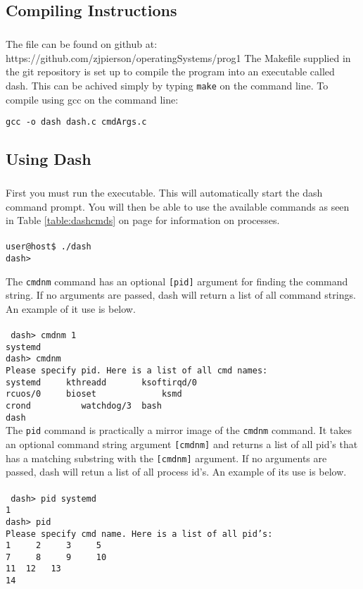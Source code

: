 \documentclass[10pt]{article}
\begin{document}
\subsection{Compiling Instructions}
\subparagraph{}
The file can be found on github at:  https://github.com/zjpierson/operatingSystems/prog1
The Makefile supplied in the git repository is set up to compile the program into an executable called dash. This can be achived simply by typing \texttt{make} on the command line. To compile using gcc on the command line:
\begin{center}
	\texttt{gcc -o dash dash.c cmdArgs.c}
\end{center}

\subsection{Using Dash}
\subparagraph{}
First you must run the executable. This will automatically start the dash command prompt. You will then be able to use the available commands as seen in Table \ref{table:dashcmds} on page \pageref{table:dashcmds} for information on processes.\\\\
\texttt{user@host\$ ./dash\\
		dash>}

\newpage

The \texttt{cmdnm} command has an optional \texttt{[pid]} argument for finding the command string. If no arguments are passed, dash will return a list of all command strings.  An example of it use is below.\\\\
\texttt
{
dash> cmdnm 1\\
systemd\\
dash> cmdnm\\
Please specify pid. Here is a list of all cmd names:\\
systemd\,\,\,\, kthreadd\,\,\,\,\,\, ksoftirqd/0\\
rcuos/0\,\,\,\, bioset\,\,\,\,\,\,\,\,\,\,\,\, ksmd\\
crond\,\,\,\,\,\,\,\,\, watchdog/3\, bash\\
dash
}\\

The \texttt{pid} command is practically a mirror image of the \texttt{cmdnm} command. It takes an optional command string argument \texttt{[cmdnm]} and returns a list of all pid's that has a matching substring with the \texttt{[cmdnm]} argument. If no arguments are passed, dash will retun a list of all process id's. An example of its use is below.\\\\
\texttt
{
dash> pid systemd\\
1\\
dash> pid\\
Please specify cmd name. Here is a list of all pid's:\\
1\,\,\,\, 2\,\,\,\, 3\,\,\,\, 5\\
7\,\,\,\, 8\,\,\,\, 9\,\,\,\, 10\\
11\,\,12\,\, 13\\
14
}\\
\end{document}
